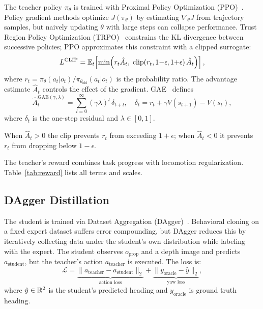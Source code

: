 The teacher policy $\pi_\theta$ is trained with Proximal Policy
Optimization (PPO)~\citep{schulman2017proximal}.
Policy gradient methods optimize $J(\pi_\theta)$ by estimating
$\nabla_\theta J$ from trajectory samples, but naively updating
$\theta$ with large steps can collapse performance.
Trust Region Policy Optimization (TRPO)~\citep{schulman2015trust}
constrains the KL divergence between successive policies; PPO
approximates this constraint with a clipped surrogate:
\begin{equation}
	L^{\text{CLIP}} = \mathbb{E}_t\!\left[\min\!\left(
		r_t \hat{A}_t,\;
		\mathrm{clip}(r_t, 1{-}\epsilon, 1{+}\epsilon)\,\hat{A}_t
		\right)\right],
	\label{eq:ppo}
\end{equation}
where $r_t = \pi_\theta(a_t|o_t) / \pi_{\theta_{\text{old}}}(a_t|o_t)$
is the probability ratio.
The advantage estimate $\hat{A}_t$ controls the effect of the gradient.  GAE~\citep{schulman2016high} defines
\begin{equation}
	\hat{A}_t^{\text{GAE}(\gamma,\lambda)}
	= \sum_{l=0}^{\infty} (\gamma\lambda)^l \,\delta_{t+l},
	\quad
	\delta_t = r_t + \gamma V(s_{t+1}) - V(s_t),
	\label{eq:gae}
\end{equation}
where $\delta_t$ is the one-step residual and $\lambda\in[0,1]$.

When $\hat{A}_t > 0$ the clip prevents $r_t$ from exceeding
$1+\epsilon$; when $\hat{A}_t < 0$ it prevents $r_t$ from dropping
below $1-\epsilon$.


The teacher's reward combines task progress with locomotion
regularization. Table~\ref{tab:reward} lists all terms and scales.

\subsection{DAgger Distillation}
\label{sec:dagger}

The student is trained via Dataset Aggregation
(DAgger)~\citep{ross2011reduction}.  Behavioral cloning on a fixed
expert dataset suffers error compounding, but DAgger reduces this by iteratively
collecting data under the student's own distribution while labeling
with the expert.  The student observes $o_\text{prop}$ and a depth
image and predicts $a_\text{student}$, but the teacher's action
$a_\text{teacher}$ is executed.  The loss is:
\begin{equation}
	\mathcal{L} =
	\underbrace{\|a_\text{teacher} - a_\text{student}\|_2}_{\text{action loss}}
	+ \underbrace{\|y_\text{oracle} - \hat{y}\|_2}_{\text{yaw loss}},
	\label{eq:dagger_loss}
\end{equation}
where $\hat{y} \in \mathbb{R}^2$ is the student's predicted heading and
$y_\text{oracle}$ is ground truth heading.

